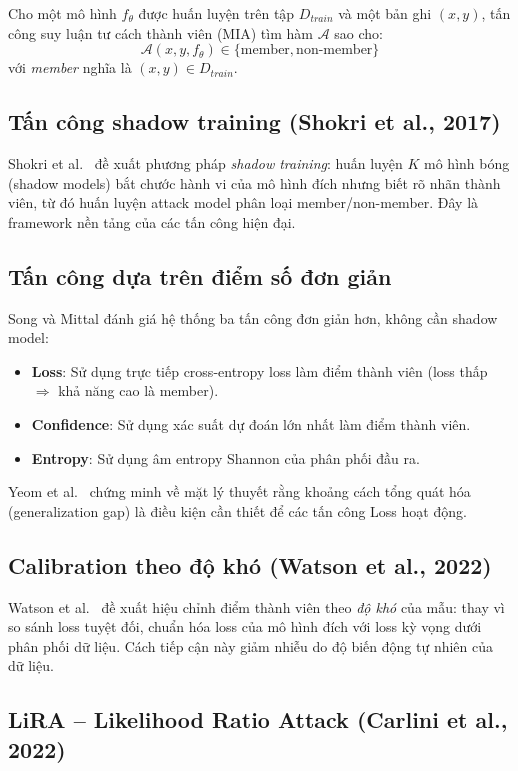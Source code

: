 \documentclass[12pt,a4paper]{report}
\begin{document}
Cho một mô hình $f_\theta$ được huấn luyện trên tập $D_{train}$ và một bản ghi $(x, y)$, tấn công suy luận tư cách thành viên (MIA) tìm hàm $\mathcal{A}$ sao cho:
\[
  \mathcal{A}(x, y, f_\theta) \in \{\text{member}, \text{non-member}\}
\]
với \textit{member} nghĩa là $(x, y) \in D_{train}$.

\subsection{Tấn công shadow training (Shokri et al., 2017)}

Shokri et al.\ \cite{shokri2017} đề xuất phương pháp \textit{shadow training}: huấn luyện $K$ mô hình bóng (shadow models) bắt chước hành vi của mô hình đích nhưng biết rõ nhãn thành viên, từ đó huấn luyện attack model phân loại member/non-member. Đây là framework nền tảng của các tấn công hiện đại.

\subsection{Tấn công dựa trên điểm số đơn giản}

Song và Mittal \cite{song2021} đánh giá hệ thống ba tấn công đơn giản hơn, không cần shadow model:
\begin{itemize}
  \item \textbf{Loss}: Sử dụng trực tiếp cross-entropy loss làm điểm thành viên (loss thấp $\Rightarrow$ khả năng cao là member).
  \item \textbf{Confidence}: Sử dụng xác suất dự đoán lớn nhất làm điểm thành viên.
  \item \textbf{Entropy}: Sử dụng âm entropy Shannon của phân phối đầu ra.
\end{itemize}
Yeom et al.\ \cite{yeom2018} chứng minh về mặt lý thuyết rằng khoảng cách tổng quát hóa (generalization gap) là điều kiện cần thiết để các tấn công Loss hoạt động.

\subsection{Calibration theo độ khó (Watson et al., 2022)}

Watson et al.\ \cite{watson2022} đề xuất hiệu chỉnh điểm thành viên theo \textit{độ khó} của mẫu: thay vì so sánh loss tuyệt đối, chuẩn hóa loss của mô hình đích với loss kỳ vọng dưới phân phối dữ liệu. Cách tiếp cận này giảm nhiễu do độ biến động tự nhiên của dữ liệu.

\subsection{LiRA -- Likelihood Ratio Attack (Carlini et al., 2022)}
\end{document}
